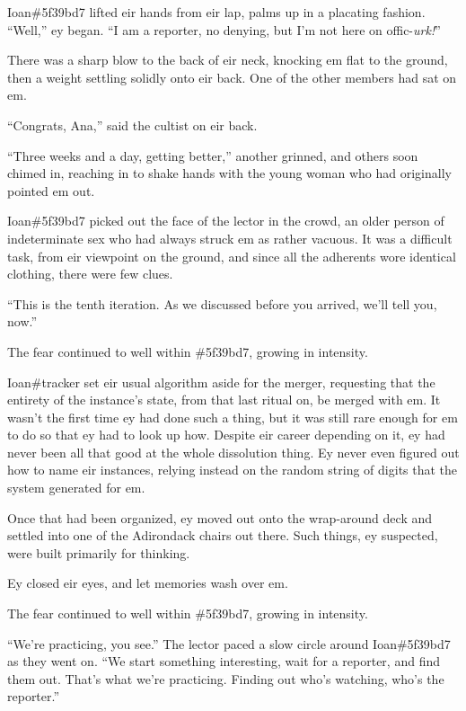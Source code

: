 Ioan\#5f39bd7 lifted eir hands from eir lap, palms up in a placating fashion. ``Well,'' ey began. ``I am a reporter, no denying, but I'm not here on offic-\emph{urk!}''

There was a sharp blow to the back of eir neck, knocking em flat to the ground, then a weight settling solidly onto eir back. One of the other members had sat on em.

``Congrats, Ana,'' said the cultist on eir back.

``Three weeks and a day, getting better,'' another grinned, and others soon chimed in, reaching in to shake hands with the young woman who had originally pointed em out.

Ioan\#5f39bd7 picked out the face of the lector in the crowd, an older person of indeterminate sex who had always struck em as rather vacuous. It was a difficult task, from eir viewpoint on the ground, and since all the adherents wore identical clothing, there were few clues.

``This is the tenth iteration. As we discussed before you arrived, we'll tell you, now.''

The fear continued to well within \#5f39bd7, growing in intensity.

\secdiv{}

\noindent Ioan\#tracker set eir usual algorithm aside for the merger, requesting that the entirety of the instance's state, from that last ritual on, be merged with em. It wasn't the first time ey had done such a thing, but it was still rare enough for em to do so that ey had to look up how. Despite eir career depending on it, ey had never been all that good at the whole dissolution thing. Ey never even figured out how to name eir instances, relying instead on the random string of digits that the system generated for em.

Once that had been organized, ey moved out onto the wrap-around deck and settled into one of the Adirondack chairs out there. Such things, ey suspected, were built primarily for thinking.

Ey closed eir eyes, and let memories wash over em.

\secdiv{}

\noindent The fear continued to well within \#5f39bd7, growing in intensity.

``We're practicing, you see.'' The lector paced a slow circle around Ioan\#5f39bd7 as they went on. ``We start something interesting, wait for a reporter, and find them out. That's what we're practicing. Finding out who's watching, who's the reporter.''


